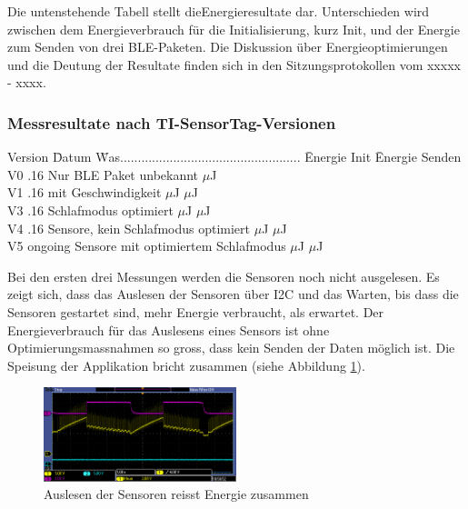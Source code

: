 Die untenstehende Tabell stellt dieEnergieresultate dar. Unterschieden wird zwischen dem Energieverbrauch für die Initialisierung, kurz Init, und der Energie zum Senden von drei BLE-Paketen. Die Diskussion über Energieoptimierungen und die Deutung der Resultate finden sich in den Sitzungsprotokollen vom xxxxx - xxxx. 


\subsubsection*{Messresultate nach TI-SensorTag-Versionen}
\begin{tabbing}
    Version   \quad\= Datum    \quad\= Was................................................... \quad\= Energie Init    \quad\=  Energie Senden \\[0.8ex]
    V0        .16  \> Nur BLE Paket      \> unbekannt             $\mu$J \\
    V1        .16  \> mit Geschwindigkeit       $\mu$J             $\mu$J \\
    V3        .16   \> Schlafmodus optimiert      $\mu$J             $\mu$J \\
    V4        .16     Sensore, kein Schlafmodus optimiert      $\mu$J             $\mu$J \\
    V5        \> ongoing     Sensore mit optimiertem Schlafmodus      $\mu$J             $\mu$J \\
\end{tabbing}

Bei den ersten drei Messungen werden die Sensoren noch nicht ausgelesen. Es zeigt sich, dass das Auslesen der Sensoren über I2C und das Warten, bis dass die Sensoren gestartet sind,  mehr Energie verbraucht, als erwartet. Der Energieverbrauch für das Auslesens eines Sensors ist ohne Optimierungsmassnahmen so gross, dass kein Senden der Daten möglich ist. Die Speisung der Applikation bricht zusammen (siehe Abbildung \ref{i2c_problem}).

\begin{figure}[ht]
    \includegraphics[width=0.5\textwidth]{3Vorgehen/imag/pic4VSUPbrichtEin.PNG} 
    \caption{Auslesen der Sensoren reisst Energie zusammen}
    \label{i2c_problem}
\end{figure}



